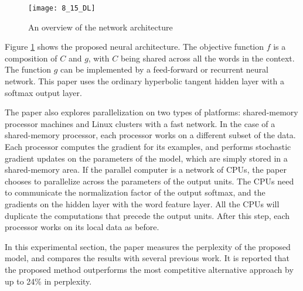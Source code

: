 \begin{figure}[htbp]
  \centering
  \texttt{[image: 8\_15\_DL]}\\
  \caption{An overview of the network architecture}\label{fig:DL}
\end{figure}

Figure \ref{fig:DL} shows the proposed neural architecture. The objective  function $f$ is a composition of $C$ and $g$, with $C$ being shared across all the words in the context. The function $g$ can be implemented by a feed-forward or recurrent neural network. This paper uses the ordinary hyperbolic tangent hidden layer with a softmax output layer.

The paper also explores parallelization on two types of platforms: shared-memory processor machines and Linux clusters with a fast network. In the case of a shared-memory processor, each processor works on a different subset of the data. Each processor computes the gradient for its examples, and performs stochastic gradient updates on the parameters of the model, which are simply stored in a shared-memory area. If the parallel computer is a network of CPUs, the paper chooses to parallelize across the parameters of the output units. The CPUs need to communicate the normalization factor of the output softmax, and the gradients on the hidden layer with the word feature layer. All the CPUs will duplicate the computations that precede the output units. After this step, each processor works on its local data as before.

In this experimental section, the paper measures the perplexity of the proposed model, and compares the results with several previous work. It is reported that the proposed method outperforms the most competitive alternative approach by up to 24\% in perplexity. 